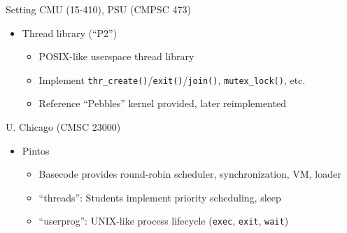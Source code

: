 \documentclass[xcolor=dvipsnames]{beamer}
\begin{document}
\begin{frame}{Setting}
	CMU (15-410), PSU (CMPSC 473)
	\begin{itemize}
		\item Thread library (``P2'')
			\begin{itemize}
				\item POSIX-like userspace thread library %
				\item Implement {\tt thr\_create()}/{\tt exit()}/{\tt join()}, {\tt mutex\_lock()}, etc.
				\item Reference ``Pebbles'' kernel provided, later reimplemented
			\end{itemize}
	\end{itemize}
	\pause
	\linegap

	U. Chicago (CMSC 23000)
	\begin{itemize}
		\item Pintos %
		\begin{itemize}
			\item Basecode provides round-robin scheduler, synchronization, VM, loader
			\item ``threads'': Students implement priority scheduling, sleep

			\item ``userprog'': UNIX-like process lifecycle
				({\tt exec}, %
				{\tt exit}, {\tt wait})
		\end{itemize}
	\end{itemize}
\end{frame}
\end{document}
